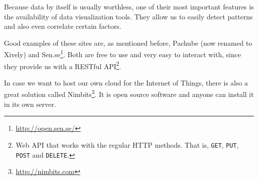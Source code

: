 Because data by itself is usually worthless, one of their most important features is the availability of data visualization tools. They allow us to easily detect patterns and also even correlate certain factors.

Good examples of these sites are, as mentioned before, Pachube (now renamed to Xively) and Sen.se\footnote{\url{http://open.sen.se/}}. Both are free to use and very easy to interact with, since they provide us with a RESTful API\footnote{Web API that works with the regular HTTP methods. That is, \texttt{GET}, \texttt{PUT}, \texttt{POST} and \texttt{DELETE}.}.

In case we want to host our own cloud for the Internet of Things, there is also a great solution called Nimbits\footnote{\url{http://nimbits.com}}. It is open source software and anyone can install it in its own server.
